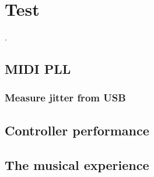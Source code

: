 
\chapter{Test}
\label{chap:test}.

\section{MIDI PLL}
\subsection{Measure jitter from USB}
\section{Controller performance}
\section{The musical experience}

\cleardoublepage
